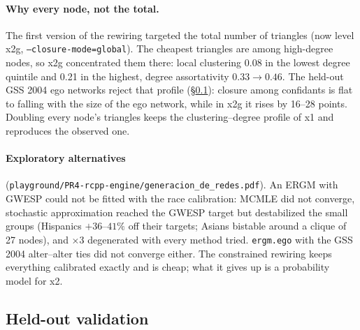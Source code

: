 \documentclass[11pt,a4paper]{article}
\newcommand{\code}[1]{\texttt{#1}}
\begin{document}
\paragraph{Why every node, not the total.} The first version of the rewiring targeted the
total number of triangles (now level x2g, \code{--closure-mode=global}). The cheapest
triangles are among high-degree nodes, so x2g concentrated them there: local clustering
0.08 in the lowest degree quintile and 0.21 in the highest, degree assortativity
$0.33 \to 0.46$. The held-out GSS 2004 ego networks reject that profile
(\S\ref{sec:validation}): closure among confidants is flat to falling with the size of the
ego network, while in x2g it rises by 16--28 points. Doubling every node's triangles keeps
the clustering--degree profile of x1 and reproduces the observed one.

\paragraph{Exploratory alternatives} (\code{playground/PR4-rcpp-engine/generacion\_de\_redes.pdf}).
An ERGM with GWESP could not be fitted with the race calibration: MCMLE did not converge,
stochastic approximation reached the GWESP target but destabilized the small groups
(Hispanics $+36$--$41\%$ off their targets; Asians bistable around a clique of 27 nodes),
and $\times 3$ degenerated with every method tried. \code{ergm.ego} with the GSS 2004
alter--alter ties did not converge either. The constrained rewiring keeps everything
calibrated exactly and is cheap; what it gives up is a probability model for x2.

\subsection{Held-out validation}
\label{sec:validation}
\end{document}
